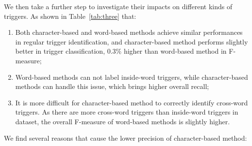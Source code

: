 We then take a further step to investigate their impacts on different kinds of triggers. As shown in Table~\ref{tab:three} that:

\begin{enumerate}
	\item Both character-based and word-based methods achieve similar performances in regular trigger identification, and character-based method performs slightly better in trigger classification, 0.3\% higher than word-based method in F-measure;
	\item Word-based methods can not label inside-word triggers, while character-based methods can handle this issue, which brings higher overall recall;
	\item It is more difficult for character-based method to correctly identify cross-word triggers. As there are more cross-word triggers than inside-word triggers in dataset, the overall F-measure of word-based methods is slightly higher.
\end{enumerate}

\begin{table}
\newcommand{\tabincell}[2]{\begin{tabular}{@{}#1@{}}#2\end{tabular}}
\end{table}

We find several reasons that cause the lower precision of character-based method:

